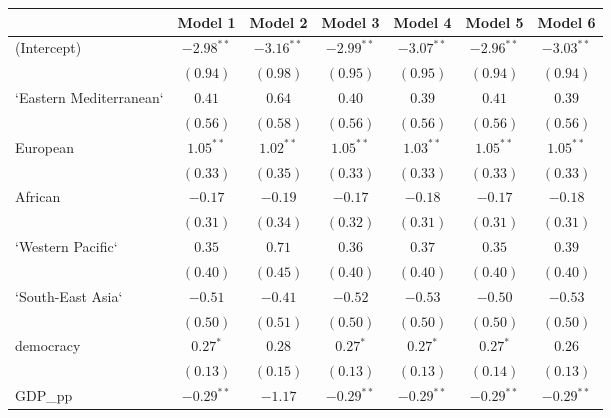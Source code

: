 
\begin{table}[!h]
\begin{center}
\begin{tabular}{l c c c c c c }
\toprule
 & Model 1 & Model 2 & Model 3 & Model 4 & Model 5 & Model 6 \\
\midrule
(Intercept)             & $-2.98^{**}$ & $-3.16^{**}$ & $-2.99^{**}$ & $-3.07^{**}$ & $-2.96^{**}$ & $-3.03^{**}$ \\
                        & $(0.94)$     & $(0.98)$     & $(0.95)$     & $(0.95)$     & $(0.94)$     & $(0.94)$     \\
`Eastern Mediterranean` & $0.41$       & $0.64$       & $0.40$       & $0.39$       & $0.41$       & $0.39$       \\
                        & $(0.56)$     & $(0.58)$     & $(0.56)$     & $(0.56)$     & $(0.56)$     & $(0.56)$     \\
European                & $1.05^{**}$  & $1.02^{**}$  & $1.05^{**}$  & $1.03^{**}$  & $1.05^{**}$  & $1.05^{**}$  \\
                        & $(0.33)$     & $(0.35)$     & $(0.33)$     & $(0.33)$     & $(0.33)$     & $(0.33)$     \\
African                 & $-0.17$      & $-0.19$      & $-0.17$      & $-0.18$      & $-0.17$      & $-0.18$      \\
                        & $(0.31)$     & $(0.34)$     & $(0.32)$     & $(0.31)$     & $(0.31)$     & $(0.31)$     \\
`Western Pacific`       & $0.35$       & $0.71$       & $0.36$       & $0.37$       & $0.35$       & $0.39$       \\
                        & $(0.40)$     & $(0.45)$     & $(0.40)$     & $(0.40)$     & $(0.40)$     & $(0.40)$     \\
`South-East Asia`       & $-0.51$      & $-0.41$      & $-0.52$      & $-0.53$      & $-0.50$      & $-0.53$      \\
                        & $(0.50)$     & $(0.51)$     & $(0.50)$     & $(0.50)$     & $(0.50)$     & $(0.50)$     \\
democracy               & $0.27^{*}$   & $0.28$       & $0.27^{*}$   & $0.27^{*}$   & $0.27^{*}$   & $0.26$       \\
                        & $(0.13)$     & $(0.15)$     & $(0.13)$     & $(0.13)$     & $(0.14)$     & $(0.13)$     \\
GDP\_pp                 & $-0.29^{**}$ & $-1.17$      & $-0.29^{**}$ & $-0.29^{**}$ & $-0.29^{**}$ & $-0.29^{**}$ \\

\end{tabular}
\end{center}
\end{table}

